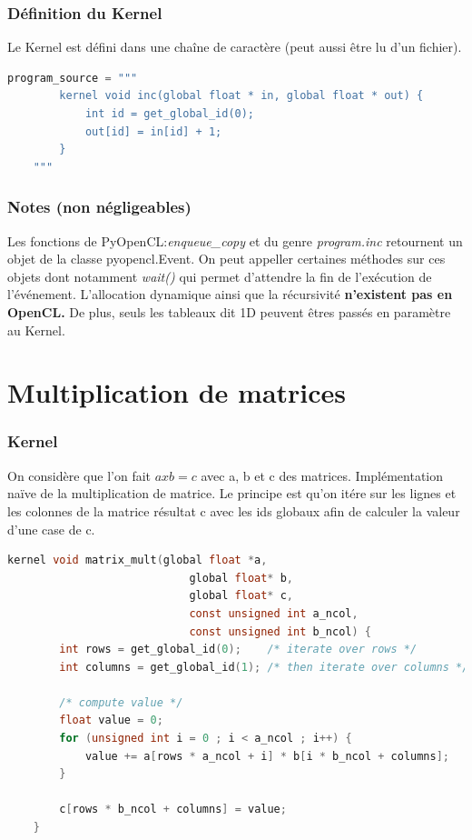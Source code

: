 \documentclass[8pt]{beamer}
\begin{document}
\begin{frame}[fragile]
    \frametitle{Définition du Kernel}
    Le Kernel est défini dans une chaîne de caractère 
    (peut aussi être lu d'un fichier).
    \begin{lstlisting}[language=python]
    program_source = """
        kernel void inc(global float * in, global float * out) {
            int id = get_global_id(0);
            out[id] = in[id] + 1;
        }
    """
    \end{lstlisting}
\end{frame}

\begin{frame}
    \frametitle{Notes (non négligeables)}
    Les fonctions de PyOpenCL:\@ \textit{enqueue\_copy} et du genre \textit{program.inc}
    retournent un objet de la classe pyopencl.Event. On peut appeller certaines méthodes
    sur ces objets dont notamment \textit{wait()} qui permet d'attendre la fin de 
    l'exécution de l'événement.
    \vspace{20pt}
    \newline
    L'allocation dynamique ainsi que la récursivité \textbf{n'existent pas en OpenCL.}
    De plus, seuls les tableaux dit 1D peuvent êtres passés en paramètre au Kernel.
\end{frame}

\section{Multiplication de matrices}
\begin{frame}[fragile]
    \frametitle{Kernel}
    On considère que l'on fait $a x b = c$ avec a, b et c des matrices.
    \vspace{20pt}
    \newline
    Implémentation naïve de la multiplication de matrice. Le principe est 
    qu'on itére sur les lignes et les colonnes de la matrice résultat c avec 
    les ids globaux afin de calculer la valeur d'une case de c.
    \begin{lstlisting}[language=c]
    kernel void matrix_mult(global float *a,
                            global float* b,
                            global float* c,
                            const unsigned int a_ncol,
                            const unsigned int b_ncol) {
        int rows = get_global_id(0);    /* iterate over rows */
        int columns = get_global_id(1); /* then iterate over columns */

        /* compute value */
        float value = 0;
        for (unsigned int i = 0 ; i < a_ncol ; i++) {
            value += a[rows * a_ncol + i] * b[i * b_ncol + columns];
        }

        c[rows * b_ncol + columns] = value;
    }
    \end{lstlisting} 
\end{frame}
\end{document}
